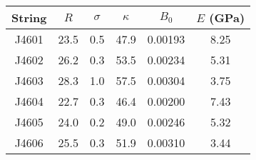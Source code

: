 \begin{tabular}{cccccc}
\toprule
String & $R$ & $\sigma$ & $\kappa$ & $B_0$ & $E$ (GPa) \\
\midrule
J4601 & 23.5 & 0.5 & 47.9 & 0.00193 & 8.25 \\
J4602 & 26.2 & 0.3 & 53.5 & 0.00234 & 5.31 \\
J4603 & 28.3 & 1.0 & 57.5 & 0.00304 & 3.75 \\
J4604 & 22.7 & 0.3 & 46.4 & 0.00200 & 7.43 \\
J4605 & 24.0 & 0.2 & 49.0 & 0.00246 & 5.32 \\
J4606 & 25.5 & 0.3 & 51.9 & 0.00310 & 3.44 \\
\bottomrule
\end{tabular}

